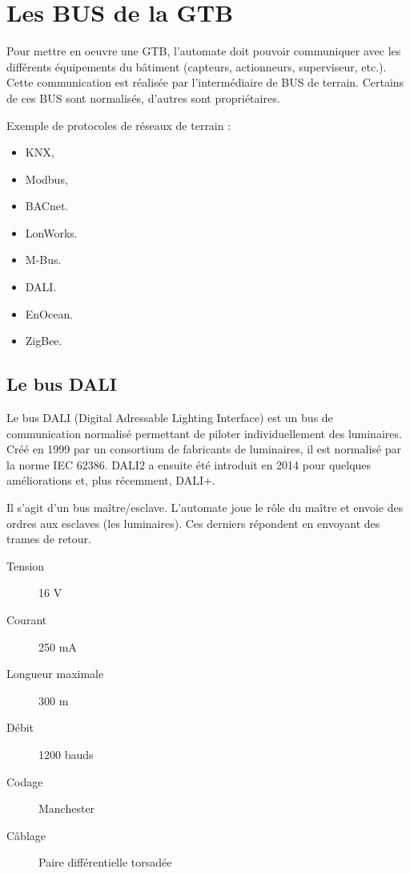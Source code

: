 \section{Les BUS de la GTB}
Pour mettre en oeuvre une GTB, l'automate doit pouvoir communiquer avec les différents équipements du bâtiment (capteurs, actionneurs, superviseur, etc.). Cette communication est réalisée par l'intermédiaire de BUS de terrain. Certains de ces BUS sont normalisés, d'autres sont propriétaires.\\

\begin{UPSTIactivite}
	\UPSTIeleveOnly{\vspace{9cm}}
\end{UPSTIactivite}

Exemple de protocoles de réseaux de terrain : 
\begin{multicols}{4}
	\begin{itemize}
		\item KNX,
		\item Modbus,
		\item BACnet.
		\item LonWorks.
		\item M-Bus.
		\item DALI.
		\item EnOcean.
		\item ZigBee.
	\end{itemize}
\end{multicols}

\pagebreak
\subsection{Le bus DALI}

	Le bus DALI (Digital Adressable Lighting Interface) est un bus de communication normalisé permettant de piloter individuellement des luminaires. Créé en 1999 par un consortium de fabricants de luminaires, il est normalisé par la norme IEC 62386. DALI2 a ensuite été introduit en 2014 pour quelques améliorations et, plus récemment, DALI+. 
	
	Il s'agit d'un bus maître/esclave. L'automate joue le rôle du maître et envoie des ordres aux esclaves (les luminaires). Ces derniers répondent en envoyant des trames de retour.\\
	\begin{multicols}{2}
			\begin{description}
		\item[Tension] 16 V
		\item[Courant] 250 mA
		\item[Longueur maximale] 300 m
		\item[Débit] 1200 bauds
		\item[Codage] Manchester
		\item[Câblage] Paire différentielle torsadée
	\end{description}
	\end{multicols}


